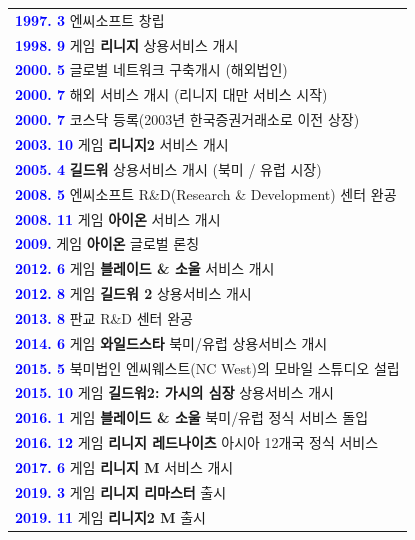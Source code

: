 \documentclass[11pt]{oblivoir}
\newenvironment{textbox}
	{
	\begin{center}
		\begin{tabular}{|p{0.95\textwidth}|}
			\hline
	}
	{
		\\ \hline
		\end{tabular}
		\end{center}
	}
\begin{document}
		\begin{textbox}	
			\textbf{\textcolor{blue}{1997. 3}} 엔씨소프트 창립			
			\\			
			\textbf{\textcolor{blue}{1998. 9}} 게임  \textbf{리니지} 상용서비스 개시			
			\\			
			\textbf{\textcolor{blue}{2000. 5}} 글로벌 네트워크 구축개시 (해외법인)			
			\\			
			\textbf{\textcolor{blue}{2000. 7}} 해외 서비스 개시 (리니지 대만 서비스 시작)			
			\\			
			\textbf{\textcolor{blue}{2000. 7}} 코스닥 등록(2003년 한국증권거래소로 이전 상장)			
			\\			
			\textbf{\textcolor{blue}{2003. 10}} 게임 \textbf{리니지2} 서비스 개시			
			\\			
			\textbf{\textcolor{blue}{2005. 4}} \textbf{길드워} 상용서비스 개시 (북미 / 유럽 시장)			
			\\			
			\textbf{\textcolor{blue}{2008. 5}} 엔씨소프트 R\&D(Research \& Development) 센터 완공			
			\\			
			\textbf{\textcolor{blue}{2008. 11}} 게임 \textbf{아이온} 서비스 개시			
			\\			
			\textbf{\textcolor{blue}{2009.}} 게임 \textbf{아이온} 글로벌 론칭			
			\\			
			\textbf{\textcolor{blue}{2012. 6}} 게임 \textbf{블레이드 \& 소울} 서비스 개시			
			\\			
			\textbf{\textcolor{blue}{2012. 8}} 게임 \textbf{길드워 2} 상용서비스 개시			
			\\			
			\textbf{\textcolor{blue}{2013. 8}} 판교 R\&D 센터 완공			
			\\			
			\textbf{\textcolor{blue}{2014. 6}} 게임 \textbf{와일드스타} 북미/유럽 상용서비스 개시			
			\\			
			\textbf{\textcolor{blue}{2015. 5}} 북미법인 엔씨웨스트(NC West)의 모바일 스튜디오 설립			
			\\			
			\textbf{\textcolor{blue}{2015. 10}} 게임 \textbf{길드워2: 가시의 심장} 상용서비스 개시			
			\\			
			\textbf{\textcolor{blue}{2016. 1}} 게임 \textbf{블레이드 \& 소울} 북미/유럽 정식 서비스 돌입			
			\\			
			\textbf{\textcolor{blue}{2016. 12}} 게임 \textbf{리니지 레드나이츠} 아시아 12개국 정식 서비스			
			\\
			\textbf{\textcolor{blue}{2017. 6}} 게임 \textbf{리니지 M} 서비스 개시
			\\
			\textbf{\textcolor{blue}{2019. 3}} 게임 \textbf{리니지 리마스터} 출시
			\\
			\textbf{\textcolor{blue}{2019. 11}} 게임 \textbf{리니지2 M} 출시
		\end{textbox}
	
\end{document}
